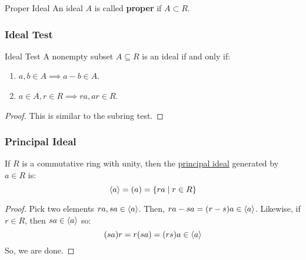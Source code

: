 \documentclass[letterpaper]{article}
\begin{document}
\begin{definition}{Proper Ideal}{}
    An ideal $A$ is called \textbf{proper} if $A \subset R$. 
\end{definition}

\subsubsection{Ideal Test}
\begin{theorem}{Ideal Test}{}
    A nonempty subset $A \subseteq R$ is an ideal if and only if: 
    \begin{enumerate}
        \item $a, b \in A \implies a - b \in A$.
        \item $a \in A, r \in R \implies ra, ar \in R$.
    \end{enumerate}
\end{theorem}

\begin{mdframed}[]
    \begin{proof}
        This is similar to the subring test.
    \end{proof}
\end{mdframed}

\subsubsection{Principal Ideal}
If $R$ is a commutative ring with unity, then the \underline{principal ideal} generated by $a \in R$ is:
\[\langle a \rangle = (a) = \{ra \mid r \in R\}\]

\begin{mdframed}[]
    \begin{proof}
        Pick two elements $ra, sa \in \langle a \rangle$. Then, $ra - sa = (r - s)a \in \langle a \rangle$. Likewise, if $r \in R$, then $sa \in \langle a \rangle$ so:
        \[(sa)r = r(sa) = (rs)a \in \langle a \rangle\]
        So, we are done. 
    \end{proof}
\end{mdframed}
\end{document}
